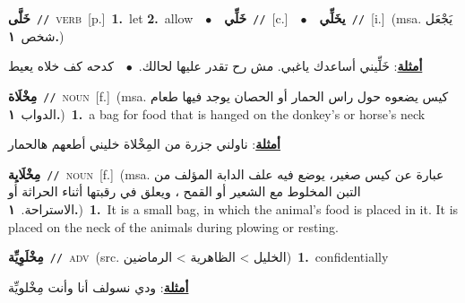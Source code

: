 \documentclass[10pt,a4paper,twoside]{article} %
\begin{document}
\begin{multicols}{2}
{\setlength\topsep{0pt}\textbf{\foreignlanguage{arabic}{خَلَّى}}\ {\color{gray}\texttt{//}\color{black}}\ \textsc{verb}\ [p.]\ \textbf{1.}~let  \textbf{2.}~allow\ \ $\bullet$\ \ \setlength\topsep{0pt}\textbf{\foreignlanguage{arabic}{خَلِّي}}\ {\color{gray}\texttt{//}\color{black}}\ [c.]\ \ $\bullet$\ \ \setlength\topsep{0pt}\textbf{\foreignlanguage{arabic}{يخَلِّي}}\ {\color{gray}\texttt{//}\color{black}}\ [i.]\ \color{gray}(msa. \foreignlanguage{arabic}{يَجْعَل شخص}~\foreignlanguage{arabic}{\textbf{١.}})\color{black}\  \begin{flushright}\color{gray}\foreignlanguage{arabic}{\textbf{\underline{\foreignlanguage{arabic}{أمثلة}}}: خَلِّيني أساعدك ياغبي. مش رح تقدر عليها لحالك.\ $\bullet$\ \  كدحه كف خلاه يعيط}\end{flushright}\color{black}} \vspace{2mm}

{\setlength\topsep{0pt}\textbf{\foreignlanguage{arabic}{مِخْلَاة}}\ {\color{gray}\texttt{//}\color{black}}\ \textsc{noun}\ [f.]\ \color{gray}(msa. \foreignlanguage{arabic}{كيس يضعوه حول راس الحمار أو الحصان يوجد فيها طعام الدواب}~\foreignlanguage{arabic}{\textbf{١.}})\color{black}\ \textbf{1.}~a bag for food that is hanged on the donkey's or horse's neck\  \begin{flushright}\color{gray}\foreignlanguage{arabic}{\textbf{\underline{\foreignlanguage{arabic}{أمثلة}}}: ناولني جزرة من المِخْلاة خليني أطعهم هالحمار}\end{flushright}\color{black}} \vspace{2mm}

{\setlength\topsep{0pt}\textbf{\foreignlanguage{arabic}{مِخْلَايِة}}\ {\color{gray}\texttt{//}\color{black}}\ \textsc{noun}\ [f.]\ \color{gray}(msa. \foreignlanguage{arabic}{عبارة عن كيس صغير، يوضع فيه علف الدابة المؤلف من التبن المخلوط مع الشعير أو القمح ، ويعلق في رقبتها أثناء الحراثة أو الاستراحة.}~\foreignlanguage{arabic}{\textbf{١.}})\color{black}\ \textbf{1.}~It is a small bag, in which the animal's food is placed in it. It is placed on the neck of the animals during plowing or resting.\ } \vspace{2mm}

{\setlength\topsep{0pt}\textbf{\foreignlanguage{arabic}{مِخْلَوِيِّة}}\ {\color{gray}\texttt{//}\color{black}}\ \textsc{adv}\ (src. \color{gray}\foreignlanguage{arabic}{الخليل > الظاهرية > الرماضين}\color{black})\ \textbf{1.}~confidentially\  \begin{flushright}\color{gray}\foreignlanguage{arabic}{\textbf{\underline{\foreignlanguage{arabic}{أمثلة}}}: ودي نسولف أنا وأنت مِخْلويِّة}\end{flushright}\color{black}} \vspace{2mm}


\end{multicols}
\end{document}
